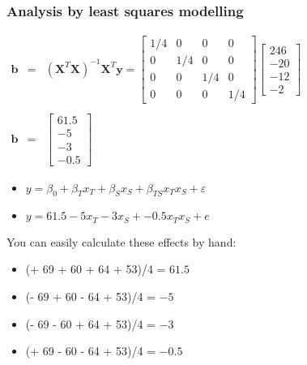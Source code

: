 \begin{frame}\frametitle{Analysis by least squares modelling}

	$
	\begin{array}{rcl}
		\mathbf{b} &=& (\mathbf{X}^T\mathbf{X})^{-1}\mathbf{X}^T\mathbf{y} =
		\begin{bmatrix}
			1/4 & 0 & 0 & 0\\
			0 & 1/4 & 0 & 0\\
			0 & 0 & 1/4 & 0\\
			0 & 0 & 0 & 1/4
		\end{bmatrix}
		\begin{bmatrix}
			246 \\
			-20 \\
			-12 \\
			-2
		\end{bmatrix}
		\\
		\\
		\mathbf{b} &=&
		\begin{bmatrix}
			61.5 \\
			-5 \\
			-3 \\
			-0.5
		\end{bmatrix}
	\end{array}
	$
	\begin{itemize}
		\item	$y = \beta_0 + \beta_Tx_T + \beta_S x_S + \beta_{TS} x_Tx_S + \varepsilon$
		\item	$y = 61.5 - 5 x_T - 3 x_S + - 0.5 x_Tx_S + e$
	\end{itemize}

	You can easily calculate these effects by hand:
	\begin{itemize}
		\item	(+ 69 + 60 + 64 + 53)/4 = $61.5$
		\item	(- 69 + 60 - 64 + 53)/4 = $-5$
		\item	(- 69 - 60 + 64 + 53)/4 = $-3$
		\item	(+ 69 - 60 - 64 + 53)/4 = $-0.5$
	\end{itemize}
\end{frame}

